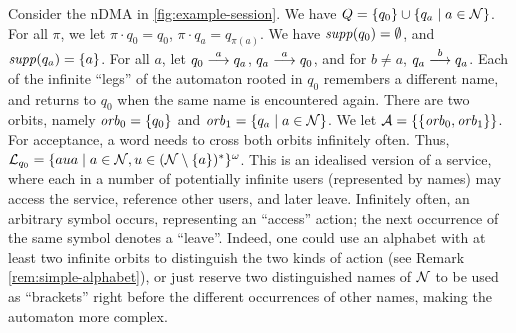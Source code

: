 \begin{example}\label{exa:session}
 Consider the nDMA in \cref{fig:example-session}. We have $Q = \{q_0\} \cup \{q_a \mid a \in \mathcal{N}\}$. For all $\pi$, we let $\pi \cdot q_0 = q_0$, $\pi \cdot q_a = q_{\pi(a)}$. We have $\mathit{supp}(q_0) = \emptyset$, and $\mathit{supp}(q_a) = \{ a \}$. For all $a$, let $q_0 \overset{a}{\longrightarrow} q_a$, $q_a \overset{a}{\longrightarrow} q_0$, and for $b \neq a$, $q_a \overset{b}{\longrightarrow} q_a$. Each of the infinite ``legs'' of the automaton rooted in $q_0$ remembers a different name, and returns to $q_0$ when the same name is encountered again. There are two orbits, namely $\mathit{orb}_0 = \{ q_0 \}$ and $\mathit{orb}_1 = \{ q_a \mid a \in \mathcal{N} \}$. We let $\mathcal{A} = \{ \{ \mathit{orb}_0, \mathit{orb}_1 \} \}$. For acceptance, a word needs to cross both orbits infinitely often. Thus, $\mathcal{L}_{q_0}=\{aua \mid a \in \mathcal{N}, u \in (\mathcal{N}\setminus\{a\})^* \}^\omega$.
% 
This is an idealised version of a service, where each in a number of potentially infinite users (represented by names) may access the service, reference other users, and later leave. Infinitely often, an arbitrary symbol occurs, representing an ``access'' action; the next occurrence of the same symbol denotes a ``leave''. Indeed, one could use an  alphabet with at least two infinite orbits to distinguish the two kinds of action (see Remark \ref{rem:simple-alphabet}), or just reserve two distinguished names of $\mathcal{N}$ to be used as ``brackets'' 	
right before the different occurrences of other names, making the automaton more complex.
\end{example}


